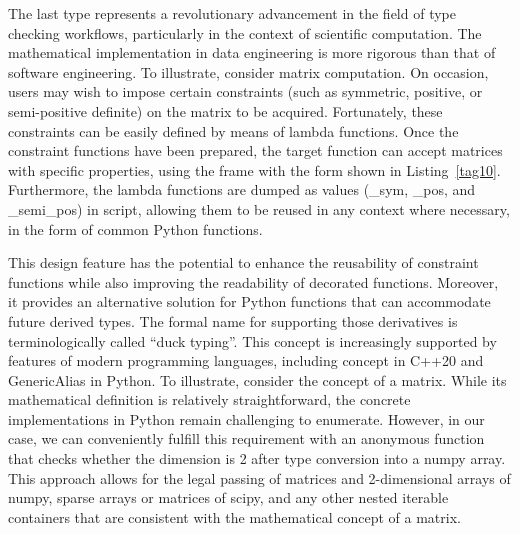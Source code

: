 \documentclass[a4paper,12pt]{article}
\newcommand{\mycite}[1]{{\color{black}\cite{#1}}}
\newcommand{\mycode}[1]{{\color{black}Listing~\ref{#1}}}
\newcommand{\inlinecode}[1]{{\ttfamily\footnotesize{#1}}}
\begin{document}


The last type represents a revolutionary advancement in the field of type checking workflows, particularly in the context of scientific computation. The mathematical implementation in data engineering is more rigorous than that of software engineering. To illustrate, consider matrix computation. On occasion, users may wish to impose certain constraints (such as symmetric, positive, or semi-positive definite) on the matrix to be acquired. Fortunately, these constraints can be easily defined by means of lambda functions. Once the constraint functions have been prepared, the target function can accept matrices with specific properties, using the frame with the form shown in \mycode{tag10}. Furthermore, the lambda functions are dumped as values (\inlinecode{\_sym}, \inlinecode{\_pos}, and \inlinecode{\_semi\_pos}) in script, allowing them to be reused in any context where necessary, in the form of common Python functions.\par



This design feature has the potential to enhance the reusability of constraint functions while also improving the readability of decorated functions. Moreover, it provides an alternative solution for Python functions that can accommodate future derived types. The formal name for supporting those derivatives is terminologically called ``duck typing''\mycite{ertl2012methods}. This concept is increasingly supported by features of modern programming languages, including \inlinecode{concept} in \inlinecode{C++20} and \inlinecode{GenericAlias} in Python\mycite{pep484, sutton2012design, pep585}. To illustrate, consider the concept of a matrix. While its mathematical definition is relatively straightforward, the concrete implementations in Python remain challenging to enumerate. However, in our case, we can conveniently fulfill this requirement with an anonymous function that checks whether the dimension is 2 after type conversion into a numpy array. This approach allows for the legal passing of matrices and 2-dimensional arrays of numpy, sparse arrays or matrices of scipy, and any other nested iterable containers that are consistent with the mathematical concept of a matrix.\par
\end{document}

